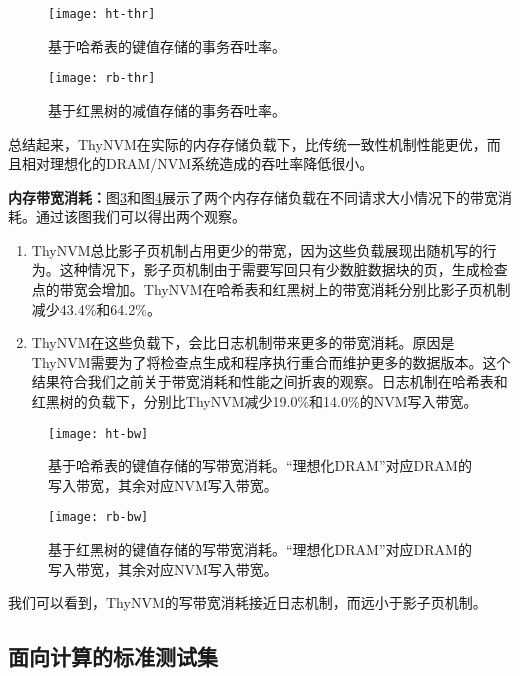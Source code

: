 \begin{figure}[!h]
  \centering
  \texttt{[image: ht-thr]}\\
  \caption{基于哈希表的键值存储的事务吞吐率。}
  \label{fig:ht-thr}
\end{figure}

\begin{figure}[!h]
  \centering
  \texttt{[image: rb-thr]}\\
  \caption{基于红黑树的减值存储的事务吞吐率。}
  \label{fig:rb-thr}
\end{figure}

总结起来，ThyNVM在实际的内存存储负载下，比传统一致性机制性能更优，而且相对理想化的DRAM/NVM系统造成的吞吐率降低很小。 

\textbf{内存带宽消耗：}图\ref{fig:ht-bw}和图\ref{fig:rb-bw}展示了两个内存存储负载在不同请求大小情况下的带宽消耗。通过该图我们可以得出两个观察。
\begin{enumerate}
\item ThyNVM总比影子页机制占用更少的带宽，因为这些负载展现出随机写的行为。这种情况下，影子页机制由于需要写回只有少数脏数据块的页，生成检查点的带宽会增加。ThyNVM在哈希表和红黑树上的带宽消耗分别比影子页机制减少43.4\%和64.2\%。
\item ThyNVM在这些负载下，会比日志机制带来更多的带宽消耗。原因是ThyNVM需要为了将检查点生成和程序执行重合而维护更多的数据版本。这个结果符合我们之前关于带宽消耗和性能之间折衷的观察。日志机制在哈希表和红黑树的负载下，分别比ThyNVM减少19.0\%和14.0\%的NVM写入带宽。
\end{enumerate}

\begin{figure}[!h]
\centering
\texttt{[image: ht-bw]}\\
\caption{基于哈希表的键值存储的写带宽消耗。``理想化DRAM''对应DRAM的写入带宽，其余对应NVM写入带宽。}
\label{fig:ht-bw}
\end{figure}

\begin{figure}[!h]
\centering
\texttt{[image: rb-bw]}\\
\caption{基于红黑树的键值存储的写带宽消耗。``理想化DRAM''对应DRAM的写入带宽，其余对应NVM写入带宽。}
\label{fig:rb-bw}
\end{figure}

我们可以看到，ThyNVM的写带宽消耗接近日志机制，而远小于影子页机制。

\subsection{面向计算的标准测试集}

